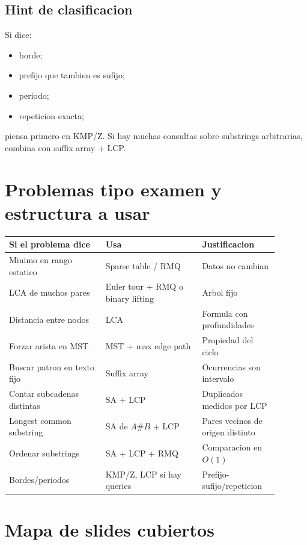 \documentclass[10pt]{article}
\newcommand{\bigO}{O}
\begin{document}
\subsection{Hint de clasificacion}
Si dice:
\begin{itemize}[leftmargin=*]
\item borde;
\item prefijo que tambien es sufijo;
\item periodo;
\item repeticion exacta;
\end{itemize}
piensa primero en KMP/Z. Si hay muchas consultas sobre substrings arbitrarias,
combina con suffix array + LCP.

\newpage
\section{Problemas tipo examen y estructura a usar}

\begin{center}
\begin{tabular}{p{0.32\linewidth}p{0.32\linewidth}p{0.25\linewidth}}
\toprule
Si el problema dice & Usa & Justificacion \\
\midrule
Minimo en rango estatico & Sparse table / RMQ & Datos no cambian \\
LCA de muchos pares & Euler tour + RMQ o binary lifting & Arbol fijo \\
Distancia entre nodos & LCA & Formula con profundidades \\
Forzar arista en MST & MST + max edge path & Propiedad del ciclo \\
Buscar patron en texto fijo & Suffix array & Ocurrencias son intervalo \\
Contar subcadenas distintas & SA + LCP & Duplicados medidos por LCP \\
Longest common substring & SA de $A\#B$ + LCP & Pares vecinos de origen distinto \\
Ordenar substrings & SA + LCP + RMQ & Comparacion en $\bigO(1)$ \\
Bordes/periodos & KMP/Z, LCP si hay queries & Prefijo-sufijo/repeticion \\
\bottomrule
\end{tabular}
\end{center}

\newpage
\section{Mapa de slides cubiertos}
\end{document}
